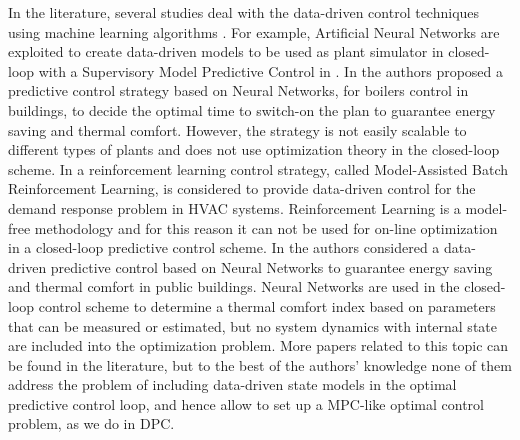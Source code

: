 In the literature, several studies deal with the data-driven control techniques using machine learning algorithms \cite{Hou2013}. For example, Artificial Neural Networks are exploited to create data-driven models to be used as plant simulator in closed-loop with a Supervisory Model Predictive Control in \cite{Afram2017}. In \cite{Macarulla2017} the authors proposed a predictive control strategy based on Neural Networks, for boilers control in buildings, to decide the optimal time to switch-on the plan to guarantee energy saving and thermal comfort. However, the strategy is not easily scalable to different types of plants and does not use optimization theory in the closed-loop scheme. In \cite{Costanzo2016} a reinforcement learning control strategy, called Model-Assisted Batch Reinforcement Learning, is considered to provide data-driven control for the demand response problem in HVAC systems. Reinforcement Learning is a model-free methodology and for this reason it can not be used for on-line optimization in a closed-loop predictive control scheme. In \cite{Ferreira2012} the authors considered a data-driven predictive control based on Neural Networks to guarantee energy saving and  thermal comfort in public buildings. Neural Networks are used in the closed-loop control scheme to determine a thermal comfort index based on parameters that can be measured or estimated, but no  system dynamics with internal state are included into the optimization problem. More papers related to this topic can be found in the literature, but to the best of the authors' knowledge none of them address the problem of including data-driven state models in the optimal predictive control loop, and hence allow to set up a MPC-like optimal control problem, as we do in DPC.

